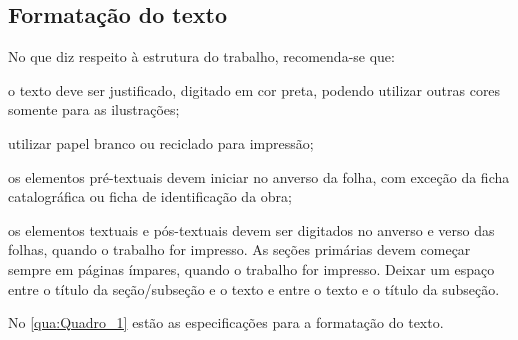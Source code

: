 \subsection{Formatação do texto}

No que diz respeito à estrutura do trabalho, recomenda-se que:
\begin{alineas}
	\item o texto deve ser justificado, digitado em cor preta, podendo utilizar outras cores somente para as ilustrações;
	\item utilizar papel branco ou reciclado para impressão;
	\item os elementos pré-textuais devem iniciar no anverso da folha, com exceção da ficha catalográfica ou ficha de identificação da obra;
	\item os elementos textuais e pós-textuais devem ser digitados no anverso e verso das folhas, quando o trabalho for impresso. As seções primárias devem começar sempre em páginas ímpares, quando o trabalho for impresso. Deixar um espaço entre o título da seção/subseção e o texto e entre o texto e o título da subseção.
\end{alineas}

No \autoref{qua:Quadro_1} estão as especificações para a formatação do texto.

